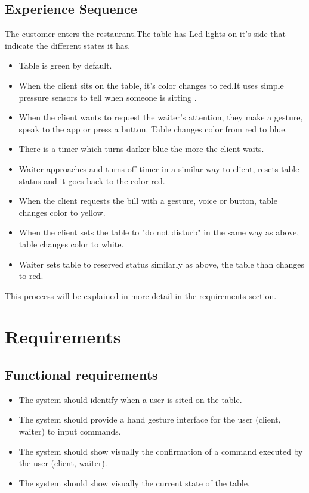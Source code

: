 \documentclass{article}
\begin{document}
\subsection{Experience Sequence }
The customer enters the restaurant.The table has Led lights on it's side that indicate the different states it has.
\begin{itemize}
    \item Table is green by default.
    \item  When the client sits on the table, it's color changes to red.It uses simple pressure sensors to tell when someone is sitting \cite{cheng2013smart}.
    \item When the client wants to request the waiter's attention, they make a gesture, speak to the app or press a button. 
    Table changes color from  red to blue.
    \item  There is  a timer which turns darker blue the more the client waits.
    \item Waiter approaches and turns off timer in a similar way to client, resets table status and it goes back to the color red.
    \item When the client requests the bill with a gesture, voice or button, table changes color to yellow.
    \item When the client sets the table to "do not disturb" in the same way as above, table changes color to white.
    \item Waiter sets table to reserved status similarly as above, the table than changes to red.
\end{itemize}
This proccess will be explained in more detail in the requirements section.
\section{Requirements}
\subsection{Functional requirements}
\begin{itemize}
    \item The system should identify when a user is sited on the table.
    \item The system should provide a hand gesture interface for the user (client, waiter) to input commands.
    \item The system should show visually the confirmation of a command executed by the user (client, waiter).
    \item The system should show visually the current state of the table.
\end{itemize}
\end{document}
